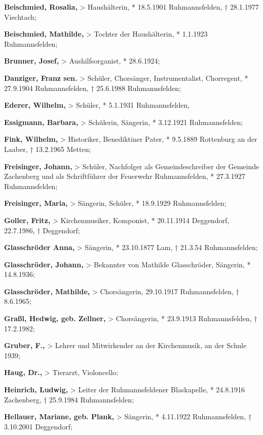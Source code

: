 \documentclass[a4paper]{article}
\begin{document}
\textbf{Beischmied, Rosalia,} {\textgreater} Haushälterin, * 18.5.1901
Ruhmannsfelden, † 28.1.1977 Viechtach;

\textbf{Beischmied, Mathilde,} {\textgreater} Tochter der Haushälterin,
* 1.1.1923 Ruhmannsfelden;

\textbf{Brunner, Josef, }{\textgreater} Aushilfsorganist, * 28.6.1924;

\textbf{Danziger, Franz sen.} {\textgreater} Schüler, Chorsänger,
Instrumentalist, Chorregent, * 27.9.1904 Ruhmannsfelden, † 25.6.1988
Ruhmannsfelden;

\textbf{Ederer, Wilhelm,} {\textgreater} Schüler, * 5.1.1931
Ruhmannsfelden,

\textbf{Essigmann, Barbara,} {\textgreater} Schülerin, Sängerin, *
3.12.1921 Ruhmannsfelden;

\textbf{Fink, Wilhelm,} {\textgreater} Historiker, Benediktiner Pater, *
9.5.1889 Rottenburg an der Laaber, † 13.2.1965 Metten;

\textbf{Freisinger, Johann,} {\textgreater} Schüler, Nachfolger als
Gemeindeschreiber der Gemeinde Zachenberg und als Schriftführer der
Feuerwehr Ruhmannsfelden, * 27.3.1927 Ruhmannsfelden;

\textbf{Freisinger, Maria,} {\textgreater} Sängerin, Schüler, *
18.9.1929 Ruhmannsfelden;

\textbf{Goller, Fritz, }{\textgreater} Kirchenmusiker, Komponist, *
20.11.1914 Deggendorf, 22.7.1986, † Deggendorf;

\textbf{Glasschröder Anna,} {\textgreater} Sängerin, * 23.10.1877 Lam, †
21.3.54 Ruhmannsfelden;

\textbf{Glasschröder, Johann,} {\textgreater} Bekannter von Mathilde
Glasschröder, Sängerin, * 14.8.1936;

\textbf{Glasschröder, Mathilde,} {\textgreater} Chorsängerin, 29.10.1917
Ruhmannsfelden, † 8.6.1965;

\textbf{Graßl, Hedwig, geb. Zellner,} {\textgreater} Chorsängerin, *
23.9.1913 Ruhmannsfelden, † 17.2.1982;

\textbf{Gruber, F.,} {\textgreater} Lehrer und Mitwirkender an der
Kirchenmusik, an der Schule 1939;

\textbf{Haug, Dr.,} {\textgreater} Tierarzt, Violoncello;

\textbf{Heinrich, Ludwig,} {\textgreater} Leiter der Ruhmannsfeldener
Blaskapelle, * 24.8.1916 Zachenberg, † 25.9.1984 Ruhmannsfelden;

\textbf{Hellauer, Mariane, geb. Plank,} {\textgreater} Sängerin, *
4.11.1922 Ruhmannsfelden, † 3.10.2001 Deggendorf;
\end{document}

